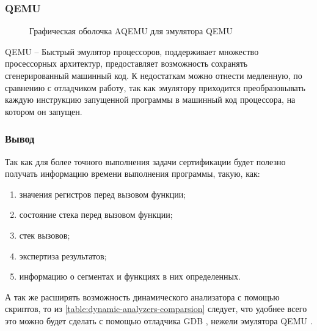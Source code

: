 \subsubsection{QEMU}\label{sec:ch1/sec3/sub2/sub2}
\begin{figure}[!htbp]
    \caption{Графическая оболочка AQEMU для эмулятора QEMU\label{fig:aqemu}}
\end{figure}
QEMU -- Быстрый эмулятор процессоров, поддерживает множество просессорных архитектур,
предоставляет возможность сохранять сгенерированный машинный код.
К недостаткам можно отнести медленную, по сравнению с отладчиком работу,
так как эмулятору приходится преобразовывать каждую инструкцию запущенной программы
в машинный код процессора, на котором он запущен.

\subsubsection{Вывод}\label{sec:ch1/sec3/sub2/sub3}

Так как для более точного выполнения задачи сертификации будет полезно получать
информацию времени выполнения программы, такую, как:
\begin{enumerate}[label={\arabic*)}]
    \item значения регистров перед вызовом функции;
    \item состояние стека перед вызовом функции;
    \item стек вызовов;
    \item экспертиза результатов;
    \item информацию о сегментах и функциях в них определенных.
\end{enumerate}
А так же расширять возможность динамического анализатора с помощью скриптов,
то из \autoref{table:dynamic-analyzers-comparsion} следует, что
удобнее всего это можно будет сделать с помощью отладчика GDB \autocite{gdb},
нежели эмулятора QEMU \autocite{qemu}.


